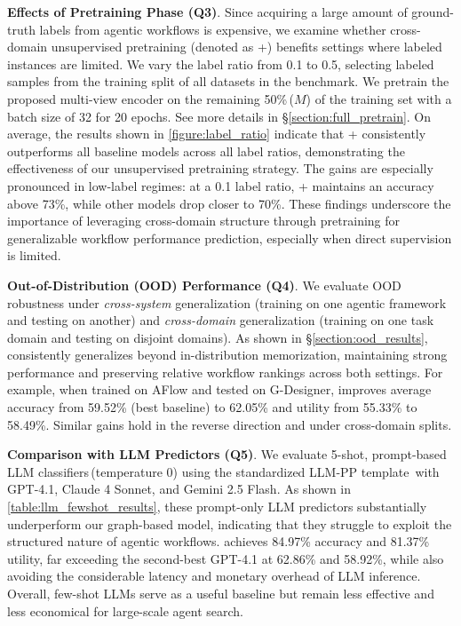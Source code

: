 \textbf{Effects of Pretraining Phase (Q3)}. Since acquiring a large amount of ground-truth labels from agentic workflows is expensive, we examine whether cross-domain unsupervised pretraining (denoted as \ours{}+) benefits settings where labeled instances are limited. We vary the label ratio from 0.1 to 0.5, selecting labeled samples from the training split of all datasets in the benchmark. We pretrain the proposed multi-view encoder on the remaining 50\%\,($M$) of the training set with a batch size of 32 for 20 epochs. See more details in \S\ref{section:full_pretrain}. On average, the results shown in \autoref{figure:label_ratio} indicate that \ours{}+ consistently outperforms all baseline models across all label ratios, demonstrating the effectiveness of our unsupervised pretraining strategy. The gains are especially pronounced in low-label regimes: at a 0.1 label ratio, \ours{}+ maintains an accuracy above 73\%, while other models drop closer to 70\%. These findings underscore the importance of leveraging cross-domain structure through pretraining for generalizable workflow performance prediction, especially when direct supervision is limited.


\textbf{Out-of-Distribution (OOD) Performance (Q4)}. We evaluate OOD robustness under \emph{cross-system} generalization (training on one agentic framework and testing on another) and \emph{cross-domain} generalization (training on one task domain and testing on disjoint domains). As shown in \S\ref{section:ood_results}, \ours{} consistently generalizes beyond in-distribution memorization, maintaining strong performance and preserving relative workflow rankings across both settings. For example, when trained on AFlow and tested on G-Designer, \ours{} improves average accuracy from 59.52\% (best baseline) to 62.05\% and utility from 55.33\% to 58.49\%. Similar gains hold in the reverse direction and under cross-domain splits.


\textbf{Comparison with LLM Predictors (Q5)}. We evaluate 5-shot, prompt-based LLM classifiers\,(temperature 0) using the standardized LLM-PP template\,\citep{LLM_PP} with GPT-4.1, Claude 4 Sonnet, and Gemini 2.5 Flash. As shown in \autoref{table:llm_fewshot_results}, these prompt-only LLM predictors substantially underperform our graph-based model, indicating that they struggle to exploit the structured nature of agentic workflows. \ours{} achieves 84.97\% accuracy and 81.37\% utility, far exceeding the second-best GPT-4.1 at 62.86\% and 58.92\%, while also avoiding the considerable latency and monetary overhead of LLM inference. Overall, few-shot LLMs serve as a useful baseline but remain less effective and less economical for large-scale agent search.




